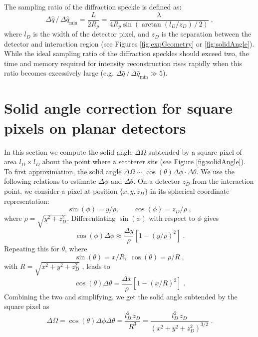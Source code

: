\documentclass[]{iucr}              %
\begin{document}
The sampling ratio of the diffraction speckle is defined as:
\begin{equation}
\Delta \widehat{q} \,/\, \Delta \widehat{q}_{\text{min}} = \frac{L}{2R_p} = \frac{\lambda}{4 R_p \sin\left( \arctan (l_D / z_D) \,/\,2 \right)}\; ,
\end{equation}
where $l_D$ is the width of the detector pixel, and $z_D$ is the separation between the detector and interaction region (see Figures \ref{fig:expGeometry} or \ref{fig:solidAngle}). While the ideal sampling ratio of the diffraction speckles should exceed two, the time and memory required for intensity reconstruction rises rapidly when this ratio becomes excessively large (e.g. $ \Delta \widehat{q} \,/\, \Delta \widehat{q}_{\text{min}} \gg 5$). 

\section{Solid angle correction for square pixels on planar detectors}\label{sec:solidAngle}



In this section we compute the solid angle $\Delta \Omega$ subtended by a square pixel of area $l_D \times l_D$ about the point where a scatterer sits (see Figure \ref{fig:solidAngle}). To first approximation, the solid angle $\Delta \Omega \sim \cos(\theta) \Delta \phi \cdot \Delta \theta$. We use the following relations to estimate  $\Delta \phi$ and $\Delta \theta$. On a detector $z_D$ from the interaction point, we consider a pixel at position $\{x,y,z_D\}$ in its spherical coordinate representation:
\begin{equation}
\sin (\phi) = y /\rho , \qquad \cos(\phi) = z_D / \rho \;,  
\end{equation}
where $\rho = \sqrt{y^2 + z_D^2}$.
Differentiating $\sin(\phi)$ with respect to $\phi$ gives
\begin{equation}
\cos(\phi) \Delta \phi \approx \frac{\Delta y}{\rho} \left[1 - \left( y/\rho\right)^2 \right]\;.
\end{equation}
Repeating this for $\theta$, where
\begin{equation}
\sin (\theta) = x /R ,\;  \cos(\theta) = \rho / R \;,
\end{equation}
with $R = \sqrt{x^2 + y^2 + z_D^2}$ , leads to 
\begin{equation}
\cos(\theta)\Delta \theta = \frac{\Delta x}{\rho} \left[ 1 - \left(x/R\right)^2\right] \;.
\end{equation}
Combining the two and simplifying, we get the solid angle subtended by the square pixel as
\begin{equation}
\Delta \Omega = \cos(\theta) \Delta \phi \Delta \theta = \frac{l_D^2\, z_D}{R^3} =  \frac{l_D^2\, z_D}{\left( x^2 + y^2 + z_D^2\right)^{3/2}} \; .
\end{equation}
\end{document}
